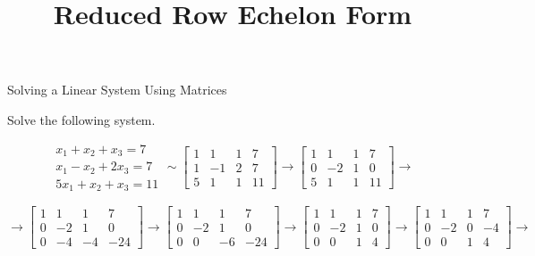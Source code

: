 \documentclass[xcolor=dvipsnames,aspectratio=169,t]{beamer}
\title{Reduced Row Echelon Form}
\begin{document}
\maketitle

\begin{frame}{Solving a Linear System Using Matrices}

  {\small  Solve the following system.}
  
  {\small
   \[
   \begin{array}{l}
     x_1 +x_2 +x_3=7 \\
     x_1 -x_2 +2x_3= 7\\
     5x_1+x_2+x_3=11
  \end{array}  \sim
      \begin{bmatrix}
        1 & 1 & 1 & 7\\
        1 & -1 & 2 & 7\\
        5 & 1 & 1 & 11
      \end{bmatrix}
      \rightarrow
       \begin{bmatrix}
        1 & 1 & 1 & 7\\
        0 & -2 & 1 & 0\\
        5 & 1 & 1 & 11
      \end{bmatrix}
    \rightarrow      \]
   }

  {\small
  \[    \rightarrow 
  \begin{bmatrix}
        1 & 1 & 1 & 7\\
        0 & -2 & 1 & 0\\
        0 & -4 & -4 & -24
      \end{bmatrix}
  \rightarrow
  \begin{bmatrix}
        1 & 1 & 1 & 7\\
        0 & -2 & 1 & 0\\
        0 & 0 & -6 & -24
  \end{bmatrix}
  \rightarrow
  \begin{bmatrix}
        1 & 1 & 1 & 7\\
        0 & -2 & 1 & 0\\
        0 & 0 & 1 & 4
      \end{bmatrix}  
  \rightarrow
  \begin{bmatrix}
        1 & 1 & 1 & 7\\
        0 & -2 & 0 & -4\\
        0 & 0 & 1 & 4
      \end{bmatrix}  
  \rightarrow
  \]}


\end{frame}
\end{document}
